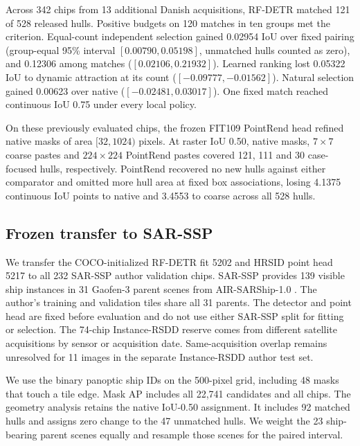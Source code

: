 \documentclass[journal]{IEEEtran}
\begin{document}
Across 342 chips from 13 additional Danish acquisitions, RF-DETR matched 121 of 528 released hulls. Positive budgets on 120 matches in ten groups met the criterion. Equal-count independent selection gained 0.02954 IoU over fixed pairing (group-equal 95\% interval \([0.00790,0.05198]\), unmatched hulls counted as zero), and 0.12306 among matches (\([0.02106,0.21932]\)). Learned ranking lost 0.05322 IoU to dynamic attraction at its count (\([-0.09777,-0.01562]\)). Natural selection gained 0.00623 over native (\([-0.02481,0.03017]\)). One fixed match reached continuous IoU 0.75 under every local policy.

On these previously evaluated chips, the frozen FIT109 PointRend head refined native masks of area \([32,1024)\) pixels. At raster IoU 0.50, native masks, \(7{\times}7\) coarse pastes and \(224{\times}224\) PointRend pastes covered 121, 111 and 30 case-focused hulls, respectively. PointRend recovered no new hulls against either comparator and omitted more hull area at fixed box associations, losing 4.1375 continuous IoU points to native and 3.4553 to coarse across all 528 hulls.

\subsection{Frozen transfer to SAR-SSP}
\label{sec:sar-ssp}
We transfer the COCO-initialized RF-DETR fit 5202 and HRSID point head 5217 to all 232 SAR-SSP author validation chips. SAR-SSP provides 139 visible ship instances in 31 Gaofen-3 parent scenes from AIR-SARShip-1.0 \cite{slgsea,airsarship}. The author's training and validation tiles share all 31 parents. The detector and point head are fixed before evaluation and do not use either SAR-SSP split for fitting or selection. The 74-chip Instance-RSDD reserve comes from different satellite acquisitions by sensor or acquisition date. Same-acquisition overlap remains unresolved for 11 images in the separate Instance-RSDD author test set.

We use the binary panoptic ship IDs on the 500-pixel grid, including 48 masks that touch a tile edge. Mask AP includes all 22,741 candidates and all chips. The geometry analysis retains the native IoU-0.50 assignment. It includes 92 matched hulls and assigns zero change to the 47 unmatched hulls. We weight the 23 ship-bearing parent scenes equally and resample those scenes for the paired interval.
\end{document}
